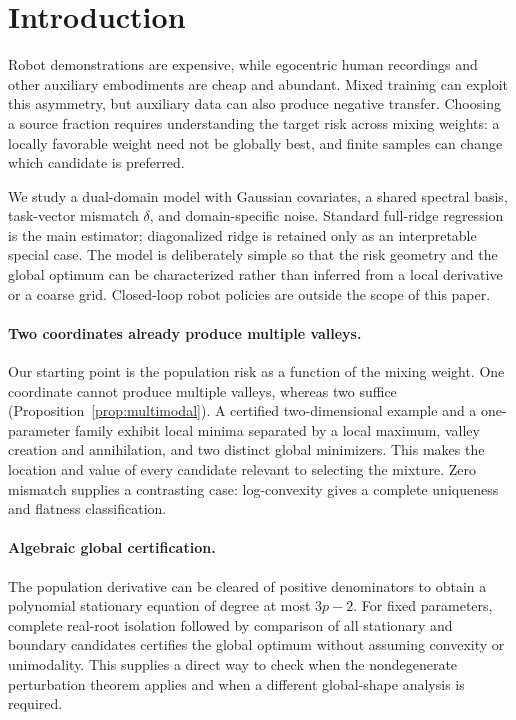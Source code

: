 \section{Introduction}
\label{sec:intro}

Robot demonstrations are expensive, while egocentric human recordings and other auxiliary embodiments are cheap and abundant. Mixed training can exploit this asymmetry, but auxiliary data can also produce negative transfer. Choosing a source fraction requires understanding the target risk across mixing weights: a locally favorable weight need not be globally best, and finite samples can change which candidate is preferred.

We study a dual-domain model with Gaussian covariates, a shared spectral basis, task-vector mismatch $\delta$, and domain-specific noise. Standard full-ridge regression is the main estimator; diagonalized ridge is retained only as an interpretable special case. The model is deliberately simple so that the risk geometry and the global optimum can be characterized rather than inferred from a local derivative or a coarse grid. Closed-loop robot policies are outside the scope of this paper.

\paragraph{Two coordinates already produce multiple valleys.}
Our starting point is the population risk as a function of the mixing weight. One coordinate cannot produce multiple valleys, whereas two suffice (Proposition~\ref{prop:multimodal}). A certified two-dimensional example and a one-parameter family exhibit local minima separated by a local maximum, valley creation and annihilation, and two distinct global minimizers. This makes the location and value of every candidate relevant to selecting the mixture. Zero mismatch supplies a contrasting case: log-convexity gives a complete uniqueness and flatness classification.

\paragraph{Algebraic global certification.}
The population derivative can be cleared of positive denominators to obtain a polynomial stationary equation of degree at most $3p-2$. For fixed parameters, complete real-root isolation followed by comparison of all stationary and boundary candidates certifies the global optimum without assuming convexity or unimodality. This supplies a direct way to check when the nondegenerate perturbation theorem applies and when a different global-shape analysis is required.

